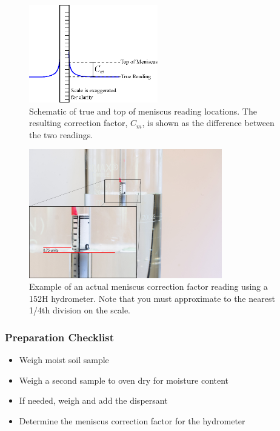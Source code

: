 \documentclass[12pt]{article}
\begin{document}
\begin{figure}[H]
    \centering
    \includegraphics[width=0.5\textwidth]{meniscus.eps}
    \caption{Schematic of true and top of meniscus reading locations. The resulting correction factor, $C_m$, is shown as the difference between the two readings.}
    \label{fig:meniscus}
\end{figure}

\begin{figure}[H]
    \centering
    \includegraphics[width=0.75\textwidth]{GEO_5746-3.jpg}
    \caption{Example of an actual meniscus correction factor reading using a 152H hydrometer. Note that you must approximate to the nearest 1/4th division on the scale.}
    \label{fig:realmeniscus}
\end{figure}

\subsubsection*{Preparation Checklist}
\begin{itemize}
    \item Weigh moist soil sample
    \item Weigh a second sample to oven dry for moisture content
    \item If needed, weigh and add the dispersant
    \item Determine the meniscus correction factor for the hydrometer
\end{itemize}
\end{document}
